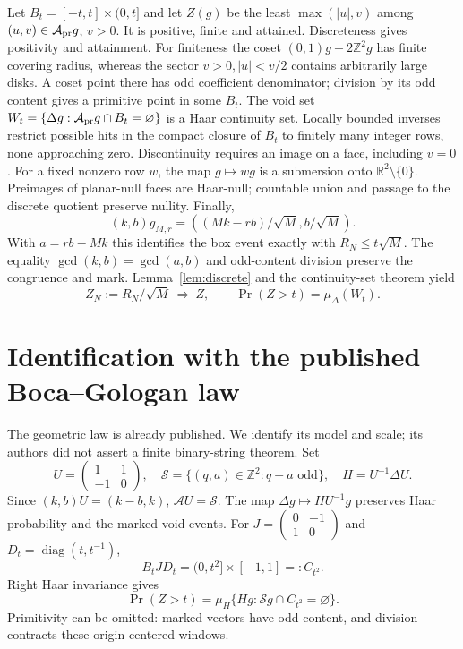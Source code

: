 \documentclass[11pt,a4paper]{article}
\numberwithin{equation}{section}
\theoremstyle{remark}
\newcommand{\Z}{\mathbb Z}
\begin{document}
Let $B_t=[-t,t]\times(0,t]$ and let $Z(g)$ be the least
$\max(|u|,v)$ among $(u,v)\in\mathcal A_{\rm pr}g$, $v>0$.
It is positive, finite and attained. Discreteness gives positivity
and attainment. For finiteness the coset $(0,1)g+2\Z^2g$ has finite
covering radius, whereas the sector $v>0,|u|<v/2$ contains arbitrarily
large disks. A coset point there has odd coefficient denominator;
division by its odd content gives a primitive point in some $B_t$.
The void set $W_t=\{\Delta g:\mathcal A_{\rm pr}g\cap B_t=\varnothing\}$
is a Haar continuity set. Locally bounded inverses restrict possible
hits in the compact closure of $B_t$ to finitely many integer rows,
none approaching zero. Discontinuity requires an image on a face,
including $v=0$. For a fixed nonzero row $w$, the map $g\mapsto wg$
is a submersion onto $\mathbb R^2\setminus\{0\}$. Preimages of
planar-null faces are Haar-null; countable union and passage to the
discrete quotient preserve nullity.
Finally,
\[
(k,b)g_{M,r}=((Mk-rb)/\sqrt M,b/\sqrt M).
\]
With $a=rb-Mk$ this identifies the box event exactly with
$R_N\le t\sqrt M$. The equality $\gcd(k,b)=\gcd(a,b)$ and odd-content
division preserve the congruence and mark. Lemma~\ref{lem:discrete}
and the continuity-set theorem yield
\begin{equation}\label{eq:weakR}
Z_N:=R_N/\sqrt M\ \Rightarrow\ Z,\qquad
\Pr(Z>t)=\mu_\Delta(W_t).
\end{equation}

\section{Identification with the published Boca--Gologan law}\label{sec:BG}
The geometric law is already published. We identify its model and
scale; its authors did not assert a finite binary-string theorem.
Set
\[
U=\begin{pmatrix}1&1\\-1&0\end{pmatrix},\quad
\mathcal S=\{(q,a)\in\Z^2:q-a\text{ odd}\},\quad H=U^{-1}\Delta U.
\]
Since $(k,b)U=(k-b,k)$, $\mathcal A U=\mathcal S$. The map
$\Delta g\mapsto H U^{-1}g$ preserves Haar probability and the
marked void events. For
$J=\left(\begin{smallmatrix}0&-1\\1&0\end{smallmatrix}\right)$ and
$D_t=\operatorname{diag}(t,t^{-1})$,
\[
B_tJD_t=(0,t^2]\times[-1,1]=:C_{t^2}.
\]
Right Haar invariance gives
\begin{equation}\label{eq:squarelaw}
\Pr(Z>t)=\mu_H\{Hg:\mathcal Sg\cap C_{t^2}=\varnothing\}.
\end{equation}
Primitivity can be omitted: marked vectors have odd content, and
division contracts these origin-centered windows.
\end{document}
